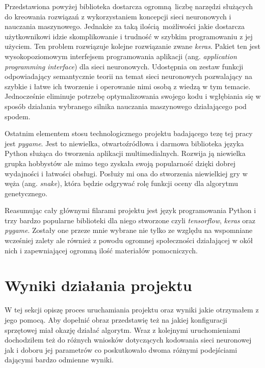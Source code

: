 \documentclass[12pt, oneside, a4paper]{report}
\begin{document}
Przedstawiona powyżej biblioteka dostarcza ogromną liczbę narzędzi służących do kreowania rozwiązań z wykorzystaniem koncepcji sieci neuronowych i nauczania maszynowego. Jednakże za taką ilością możliwości jakie dostarcza użytkownikowi idzie skomplikowanie i trudność w szybkim programowaniu z jej użyciem. Ten problem rozwiązuje kolejne rozwiązanie zwane \textit{keras}. Pakiet ten jest wysokopoziomowym interfejsem programowania aplikacji (ang. \textit{application programming interface}) dla sieci neuronowych. Udostępnia on zestaw funkcji odpowiadający semantycznie teorii na temat sieci neuronowych pozwalający na szybkie i łatwe ich tworzenie i operowanie nimi osobą z wiedzą w tym temacie. Jednocześnie eliminuje potrzebę optymalizowania swojego kodu i wgłębiania się w sposób działania wybranego silnika nauczania maszynowego działającego pod spodem.

Ostatnim elementem stosu technologicznego projektu badającego tezę tej pracy jest \textit{pygame}. Jest to niewielka, otwartoźródłowa i darmowa biblioteka języka Python służąca do tworzenia aplikacji multimedialnych. Rozwija ją niewielka grupka hobbystów ale mimo tego zyskała swoją popularność dzięki dobrej wydajności i łatwości obsługi. Posłuży mi ona do stworzenia niewielkiej gry w węża (ang. \textit{snake}), która będzie odgrywać rolę funkcji oceny dla algorytmu genetycznego.

Reasumując cały głównymi filarami projektu jest język programowania Python i trzy bardzo popularne biblioteki dla niego stworzone czyli \textit{tensorflow}, \textit{keras} oraz \textit{pygame}. Zostały one przeze mnie wybrane nie tylko ze względu na wspomniane wcześniej zalety ale również z powodu ogromnej społeczności działającej w okół nich i zapewniającej ogromną ilość materiałów pomocniczych.


\chapter{Wyniki działania projektu}

W tej sekcji opiszę proces uruchamiania projektu oraz wyniki jakie otrzymałem z jego pomocą. Aby dopełnić obraz przedstawię też na jakiej konfiguracji sprzętowej miał okazję działać algorytm. Wraz z kolejnymi uruchomieniami dochodziłem też do różnych wniosków dotyczących kodowania sieci neuronowej jak i doboru jej parametrów co poskutkowało dwoma różnymi podejściami dającymi bardzo odmienne wyniki.
\end{document}

